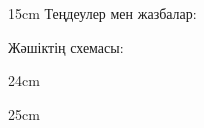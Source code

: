 
\answersheetwritenumbers

\begin{blankbox}{15cm}
    Теңдеулер мен жазбалар:

    \vspace{7cm}

    Жәшіктің схемасы:
\end{blankbox}

\newpage

\begin{blankbox}{24cm}
\begin{center}
\end{center}
\end{blankbox}

\newpage

\begin{blankbox}{25cm}
\begin{center}
\end{center}
\end{blankbox}
